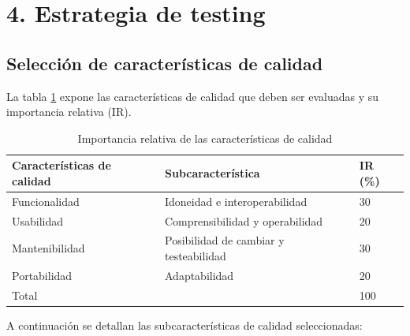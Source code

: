 \documentclass[
11pt, %
codirector, %
]{simple_charter}
\begin{document}
\section{4. Estrategia de testing}
\label{sec:4-estrategia-de-testing}

\subsection{Selección de características de calidad}
\label{ssec:seleccion-de-caracteristicas-de-calidad}

La tabla \ref{tab:qualty-char} expone las características de calidad que deben ser evaluadas
y su importancia relativa (IR).

\begin{table}[ht]
\centering
\begin{tabular}{@{}lll@{}}
\toprule
\textbf{Características de calidad} & \textbf{Subcaracterística} & \textbf{IR (\%)} \\ \midrule
Funcionalidad & Idoneidad e interoperabilidad & 30 \\
Usabilidad & Comprensibilidad y operabilidad & 20 \\
Mantenibilidad & Posibilidad de cambiar y testeabilidad & 30 \\
Portabilidad & Adaptabilidad & 20 \\
Total & & 100 \\ \bottomrule
\end{tabular}
\caption{Importancia relativa de las características de calidad}
\label{tab:qualty-char}
\end{table}

A continuación se detallan las subcaracterísticas de calidad seleccionadas:
\end{document}
